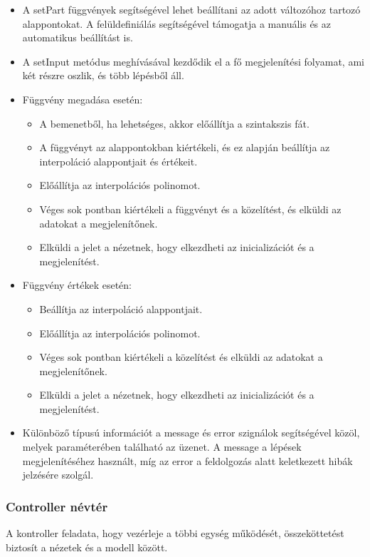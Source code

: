\documentclass[12pt]{report}
\begin{document}
\begin{itemize}
\item A setPart függvények segítségével lehet beállítani az adott változóhoz tartozó alappontokat. A felüldefiniálás segítségével támogatja a manuális és az automatikus beállítást is.
\item A setInput metódus meghívásával kezdődik el a fő megjelenítési folyamat, ami két részre oszlik, és több lépésből áll.
\item Függvény megadása esetén:
	\begin{itemize}
		\item A bemenetből, ha lehetséges, akkor előállítja a szintakszis fát.
		\item A függvényt az alappontokban kiértékeli, és ez alapján beállítja az interpoláció alappontjait és értékeit.
		\item Előállítja az interpolációs polinomot.
		\item Véges sok pontban kiértékeli a függvényt és a közelítést, és elküldi az adatokat a megjelenítőnek.
		\item Elküldi a jelet a nézetnek, hogy elkezdheti az inicializációt és a megjelenítést.
	\end{itemize}
\item Függvény értékek esetén:
	\begin{itemize}
		\item Beállítja az interpoláció alappontjait.
		\item Előállítja az interpolációs polinomot.
		\item Véges sok pontban kiértékeli a közelítést és elküldi az adatokat a megjelenítőnek.
		\item Elküldi a jelet a nézetnek, hogy elkezdheti az inicializációt és a megjelenítést.
	\end{itemize}
\item Különböző típusú információt a message és error szignálok segítségével közöl, melyek paraméterében található az üzenet. A message a lépések megjelenítéséhez használt, míg az error a feldolgozás alatt keletkezett hibák jelzésére szolgál.
\end{itemize}

\subsubsection{Controller névtér}
A kontroller feladata, hogy vezérleje a többi egység működését, összeköttetést biztosít a nézetek és a modell között. 
\end{document}
